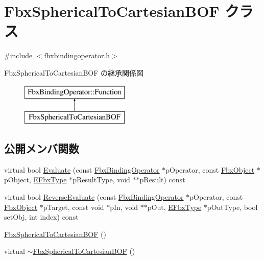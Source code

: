 \hypertarget{class_fbx_spherical_to_cartesian_b_o_f}{}\section{Fbx\+Spherical\+To\+Cartesian\+B\+OF クラス}
\label{class_fbx_spherical_to_cartesian_b_o_f}


{\ttfamily \#include $<$fbxbindingoperator.\+h$>$}

Fbx\+Spherical\+To\+Cartesian\+B\+OF の継承関係図\begin{figure}[H]
\begin{center}
\leavevmode
\includegraphics[height=2.000000cm]{class_fbx_spherical_to_cartesian_b_o_f}
\end{center}
\end{figure}
\subsection*{公開メンバ関数}
\begin{DoxyCompactItemize}
\item 
virtual bool \hyperlink{class_fbx_spherical_to_cartesian_b_o_f_a0c53f8982c1e6c6ca7772ab2503f7d2d}{Evaluate} (const \hyperlink{class_fbx_binding_operator}{Fbx\+Binding\+Operator} $\ast$p\+Operator, const \hyperlink{class_fbx_object}{Fbx\+Object} $\ast$p\+Object, \hyperlink{fbxpropertytypes_8h_a73913a5ddfb20e57c6f25e9e6784bd92}{E\+Fbx\+Type} $\ast$p\+Result\+Type, void $\ast$$\ast$p\+Result) const
\item 
virtual bool \hyperlink{class_fbx_spherical_to_cartesian_b_o_f_a05d7c7e0e46df48e22f01f0b09a86bae}{Reverse\+Evaluate} (const \hyperlink{class_fbx_binding_operator}{Fbx\+Binding\+Operator} $\ast$p\+Operator, const \hyperlink{class_fbx_object}{Fbx\+Object} $\ast$p\+Target, const void $\ast$p\+In, void $\ast$$\ast$p\+Out, \hyperlink{fbxpropertytypes_8h_a73913a5ddfb20e57c6f25e9e6784bd92}{E\+Fbx\+Type} $\ast$p\+Out\+Type, bool set\+Obj, int index) const
\item 
\hyperlink{class_fbx_spherical_to_cartesian_b_o_f_a6a34b2c35046672a7ed9f9edf68cfebb}{Fbx\+Spherical\+To\+Cartesian\+B\+OF} ()
\item 
virtual \hyperlink{class_fbx_spherical_to_cartesian_b_o_f_a1521a286e12379f2f0f4b6f67b7f11eb}{$\sim$\+Fbx\+Spherical\+To\+Cartesian\+B\+OF} ()
\end{DoxyCompactItemize}

